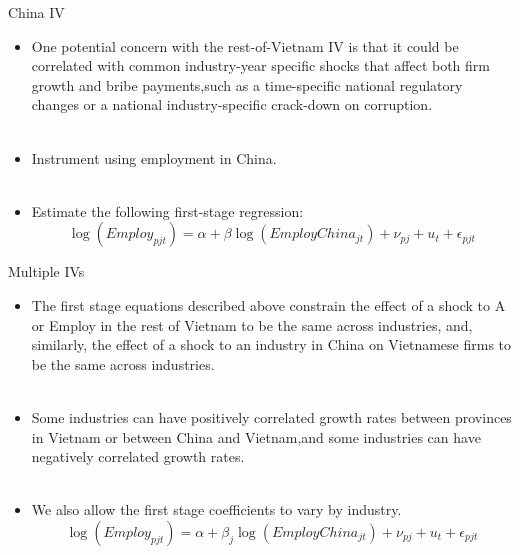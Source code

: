 \documentclass{beamer}
\begin{document}
\begin{frame}{China IV}

\begin{itemize}
\item One potential concern with the rest-of-Vietnam IV is that it could be correlated with common industry-year specific shocks that affect both firm growth and bribe payments,such as a time-specific national regulatory changes or a national industry-specific crack-down on corruption. \\~

\item Instrument using employment in China. \\~

\item Estimate the following first-stage regression:
\begin{equation}
\log \left( Employ_{pjt} \right) =\alpha +\beta \log \left( EmployChina_{jt} \right) +\nu _{pj}+u_t+\epsilon _{pjt}
\end{equation}

\end{itemize}

\end{frame}	

\begin{frame}{Multiple IVs}

\begin{itemize}
\item The first stage equations described above constrain the effect of a shock to A or Employ in the rest of Vietnam to be the same across industries, and, similarly, the effect of a shock to an industry in China on Vietnamese firms to be the same across industries.\\~

\item Some industries can have positively correlated growth rates between provinces in Vietnam or between China and Vietnam,and some industries can have negatively correlated growth rates.\\~

\item We also allow the first stage coefficients to vary by industry.
\begin{equation}
\log \left( Employ_{pjt} \right) =\alpha +\beta _j\log \left( EmployChina_{jt} \right) +\nu _{pj}+u_t+\epsilon _{pjt}
\end{equation}

\end{itemize}

\end{frame}	
\end{document}
